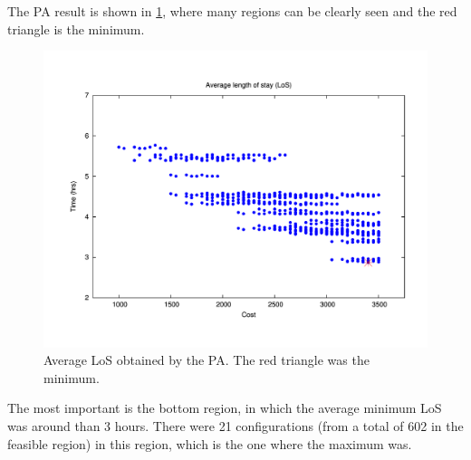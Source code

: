 The PA result is shown in \ref{subfig:pipe17-1}, where many regions
can be clearly seen and the red triangle is the minimum.
\begin{figure}[H]
\noindent \begin{centering}
\includegraphics[width=0.95\columnwidth,height=0.25\paperheight]{figs4/v0/pipe-sorted-LoS_1_0_min}
\par\end{centering}

\caption{Average LoS obtained by the PA. The red triangle was the minimum.
\label{subfig:pipe17-1}}
\end{figure}
 The most important is the bottom region, in which the average minimum
LoS was around than 3 hours. There were 21 configurations (from a
total of 602 in the feasible region) in this region, which is the
one where the maximum was.

